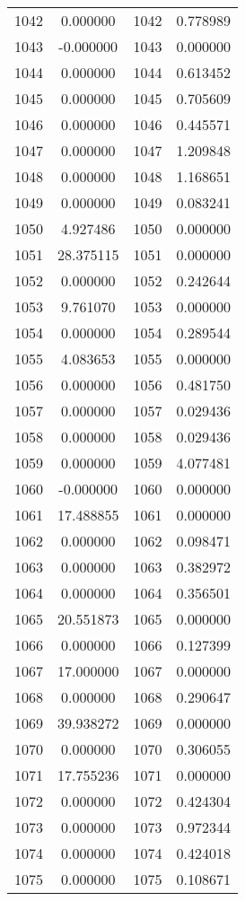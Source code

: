 \documentclass[12pt]{article}
\begin{document}
\begin{longtable}{@{}cccc@{}}
1042 & 0.000000 & 1042 & 0.778989 \\
1043 & -0.000000 & 1043 & 0.000000 \\
1044 & 0.000000 & 1044 & 0.613452 \\
1045 & 0.000000 & 1045 & 0.705609 \\
1046 & 0.000000 & 1046 & 0.445571 \\
1047 & 0.000000 & 1047 & 1.209848 \\
1048 & 0.000000 & 1048 & 1.168651 \\
1049 & 0.000000 & 1049 & 0.083241 \\
1050 & 4.927486 & 1050 & 0.000000 \\
1051 & 28.375115 & 1051 & 0.000000 \\
1052 & 0.000000 & 1052 & 0.242644 \\
1053 & 9.761070 & 1053 & 0.000000 \\
1054 & 0.000000 & 1054 & 0.289544 \\
1055 & 4.083653 & 1055 & 0.000000 \\
1056 & 0.000000 & 1056 & 0.481750 \\
1057 & 0.000000 & 1057 & 0.029436 \\
1058 & 0.000000 & 1058 & 0.029436 \\
1059 & 0.000000 & 1059 & 4.077481 \\
1060 & -0.000000 & 1060 & 0.000000 \\
1061 & 17.488855 & 1061 & 0.000000 \\
1062 & 0.000000 & 1062 & 0.098471 \\
1063 & 0.000000 & 1063 & 0.382972 \\
1064 & 0.000000 & 1064 & 0.356501 \\
1065 & 20.551873 & 1065 & 0.000000 \\
1066 & 0.000000 & 1066 & 0.127399 \\
1067 & 17.000000 & 1067 & 0.000000 \\
1068 & 0.000000 & 1068 & 0.290647 \\
1069 & 39.938272 & 1069 & 0.000000 \\
1070 & 0.000000 & 1070 & 0.306055 \\
1071 & 17.755236 & 1071 & 0.000000 \\
1072 & 0.000000 & 1072 & 0.424304 \\
1073 & 0.000000 & 1073 & 0.972344 \\
1074 & 0.000000 & 1074 & 0.424018 \\
1075 & 0.000000 & 1075 & 0.108671 \\

\end{longtable}
\end{document}
